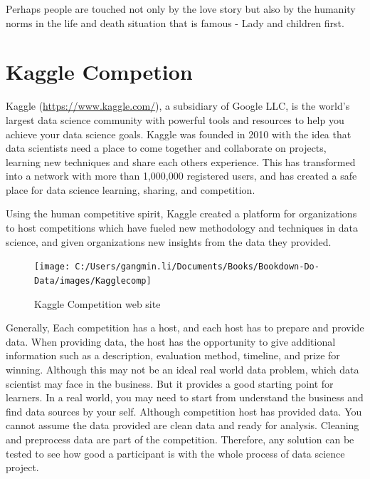 \documentclass[
]{book}
\renewenvironment{quote}{\begin{VF}}{\end{VF}}
\begin{document}
Perhaps people are touched not only by the love story but also by the humanity norms in the life and death situation that is famous - Lady and children first.

\begin{quote}
\end{quote}

\hypertarget{kaggle-competion}{%
\section{Kaggle Competion}\label{kaggle-competion}}

Kaggle (\url{https://www.kaggle.com/}), a subsidiary of Google LLC, is the world's largest data science community with powerful tools and resources to help you achieve your data science goals. Kaggle was founded in 2010 with the idea that data scientists need a place to come together and collaborate on projects, learning new techniques and share each others experience. This has transformed into a network with more than 1,000,000 registered users, and has created a safe place for data science learning, sharing, and competition.

Using the human competitive spirit, Kaggle created a platform for organizations to host competitions which have fueled new methodology and techniques in data science, and given organizations new insights from the data they provided.

\begin{figure}

{\centering \texttt{[image: C:/Users/gangmin.li/Documents/Books/Bookdown-Do-Data/images/Kagglecomp]} 

}

\caption{Kaggle Competition web site}\label{fig:unnamed-chunk-8}
\end{figure}

Generally, Each competition has a host, and each host has to prepare and provide data. When providing data, the host has the opportunity to give additional information such as a description, evaluation method, timeline, and prize for winning. Although this may not be an ideal real world data problem, which data scientist may face in the business. But it provides a good starting point for learners. In a real world, you may need to start from understand the business and find data sources by your self. Although competition host has provided data. You cannot assume the data provided are clean data and ready for analysis. Cleaning and preprocess data are part of the competition. Therefore, any solution can be tested to see how good a participant is with the whole process of data science project.
\end{document}
